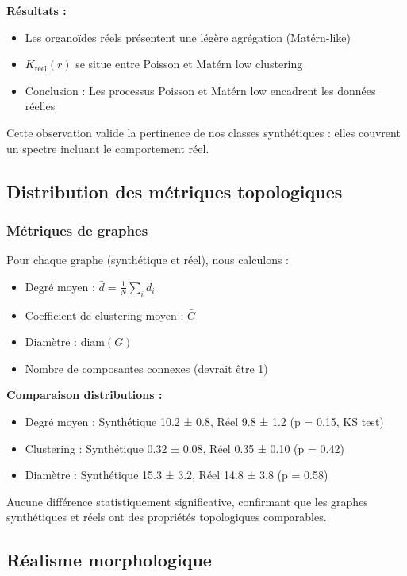 \textbf{Résultats :}
\begin{itemize}
    \item Les organoïdes réels présentent une légère agrégation (Matérn-like)
    \item $K_{\text{réel}}(r)$ se situe entre Poisson et Matérn low clustering
    \item Conclusion : Les processus Poisson et Matérn low encadrent les données réelles
\end{itemize}

Cette observation valide la pertinence de nos classes synthétiques : elles couvrent un spectre incluant le comportement réel.

\subsection{Distribution des métriques topologiques}

\subsubsection{Métriques de graphes}

Pour chaque graphe (synthétique et réel), nous calculons :
\begin{itemize}
    \item Degré moyen : $\bar{d} = \frac{1}{N}\sum_i d_i$
    \item Coefficient de clustering moyen : $\bar{C}$
    \item Diamètre : diam$(G)$
    \item Nombre de composantes connexes (devrait être 1)
\end{itemize}

\textbf{Comparaison distributions :}
\begin{itemize}
    \item Degré moyen : Synthétique 10.2 ± 0.8, Réel 9.8 ± 1.2 (p = 0.15, KS test)
    \item Clustering : Synthétique 0.32 ± 0.08, Réel 0.35 ± 0.10 (p = 0.42)
    \item Diamètre : Synthétique 15.3 ± 3.2, Réel 14.8 ± 3.8 (p = 0.58)
\end{itemize}

Aucune différence statistiquement significative, confirmant que les graphes synthétiques et réels ont des propriétés topologiques comparables.

\subsection{Réalisme morphologique}

